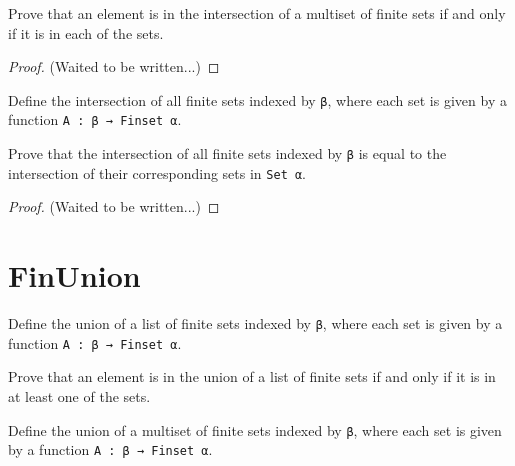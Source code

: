 \begin{lemma}\label{Multiset.eq_FinInter}
  \leanok
  Prove that an element is in the intersection of a multiset of finite sets if and only if it is in each of the sets.
\end{lemma}

\begin{proof}
  \leanok
  (Waited to be written...)
\end{proof}

\begin{definition}\label{FinInter₀}
  \leanok
  Define the intersection of all finite sets indexed by \verb|β|, where each set is given by a function \verb|A : β → Finset α|.
\end{definition}

\begin{lemma}\label{eq_FinInter₀}
  \leanok
  Prove that the intersection of all finite sets indexed by \verb|β| is equal to the intersection of their corresponding sets in \verb|Set α|.
\end{lemma}

\begin{proof}
  \leanok
  (Waited to be written...)
\end{proof}

\section{FinUnion}

\begin{definition}\label{List.FinUnion}
  \leanok
  Define the union of a list of finite sets indexed by \verb|β|, where each set is given by a function \verb|A : β → Finset α|.
\end{definition}

\begin{lemma}\label{List.eq_FinUnion}
  Prove that an element is in the union of a list of finite sets if and only if it is in at least one of the sets.
\end{lemma}

\begin{definition}\label{Multiset.FinUnion}
  Define the union of a multiset of finite sets indexed by \verb|β|, where each set is given by a function \verb|A : β → Finset α|.
\end{definition}

